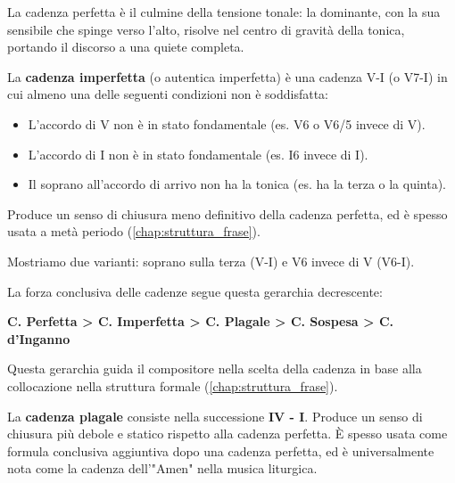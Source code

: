 	La cadenza perfetta è il culmine della tensione tonale: la dominante, con la sua sensibile che spinge verso l'alto, risolve nel centro di gravità della tonica, portando il discorso a una quiete completa.
	
	\begin{esempio}
		\label{ex:cadenza_perfecta}
	\end{esempio}

	\begin{definizione}
		\label{def:cadenza_imperfetta}
		La \textbf{cadenza imperfetta} (o autentica imperfetta) è una cadenza V-I (o V7-I) in cui almeno una delle seguenti condizioni non è soddisfatta:
		\begin{itemize}
			\item L'accordo di V non è in stato fondamentale (es. V6 o V6/5 invece di V).
			\item L'accordo di I non è in stato fondamentale (es. I6 invece di I).
			\item Il soprano all'accordo di arrivo non ha la tonica (es. ha la terza o la quinta).
		\end{itemize}
		Produce un senso di chiusura meno definitivo della cadenza perfetta, ed è spesso usata a metà periodo (\ref{chap:struttura_frase}).
	\end{definizione}

	\begin{esempio}
		Mostriamo due varianti: soprano sulla terza (V-I) e V6 invece di V (V6-I).
	\end{esempio}

    \begin{regola}
        \label{reg:gerarchia_cadenze}
        La forza conclusiva delle cadenze segue questa gerarchia decrescente:
        \begin{center}
            \textbf{C. Perfetta > C. Imperfetta > C. Plagale > C. Sospesa > C. d'Inganno}
        \end{center}
        Questa gerarchia guida il compositore nella scelta della cadenza in base alla collocazione nella struttura formale (\ref{chap:struttura_frase}).
    \end{regola}
	
	\begin{definizione}
		\label{def:cadenza_plagale}
		La \textbf{cadenza plagale} consiste nella successione \textbf{IV - I}. Produce un senso di chiusura più debole e statico rispetto alla cadenza perfetta. È spesso usata come formula conclusiva aggiuntiva dopo una cadenza perfetta, ed è universalmente nota come la cadenza dell'"Amen" nella musica liturgica.
	\end{definizione}
	

